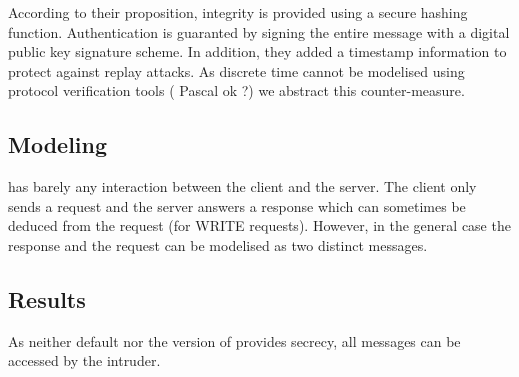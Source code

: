 According to their proposition, integrity is provided using a secure hashing
function.
Authentication is guaranted by signing the entire message with a digital public
key signature scheme.
In addition, they added a timestamp information to protect against replay
attacks.
As discrete time cannot be modelised using protocol verification tools (\TODO
Pascal ok ?) we abstract this counter-measure.

\subsection{Modeling}

\modbus has barely any interaction between the client and the server.
The client only sends a request and the server answers a response which can
sometimes be deduced from the request (\eg for WRITE requests).
However, in the general case the response and the request can be modelised as
two distinct messages.

\subsection{Results}

As neither default \modbus nor the version of \cite{FCMT09} provides secrecy,
all messages can be accessed by the intruder.

\begin{table}[htb]
    \centering
\end{table}

%
%
%
